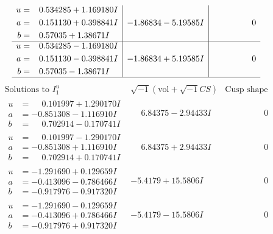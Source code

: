 \documentclass[1p]{elsarticle_modified}
\theoremstyle{definition}
\newcommand{\I}{\sqrt{-1}}
\begin{document}
$$\begin{array}{c|c|c}
\begin{aligned}
u &= \phantom{-}0.534285 + 1.169180 I \\
a &= \phantom{-}0.151130 + 0.398841 I \\
b &= \phantom{-}0.57035 + 1.38671 I\end{aligned}
 & -1.86834 - 5.19585 I & \phantom{-0.000000 } 0 \\ \hline\begin{aligned}
u &= \phantom{-}0.534285 - 1.169180 I \\
a &= \phantom{-}0.151130 - 0.398841 I \\
b &= \phantom{-}0.57035 - 1.38671 I\end{aligned}
 & -1.86834 + 5.19585 I & \phantom{-0.000000 } 0\\
 \hline 
 \end{array}$$\newpage$$\begin{array}{c|c|c}  
\text{Solutions to }I^u_{1}& \I (\text{vol} + \sqrt{-1}CS) & \text{Cusp shape}\\
 \hline 
\begin{aligned}
u &= \phantom{-}0.101997 + 1.290170 I \\
a &= -0.851308 - 1.116910 I \\
b &= \phantom{-}0.702914 - 0.170741 I\end{aligned}
 & \phantom{-}6.84375 - 2.94433 I & \phantom{-0.000000 } 0 \\ \hline\begin{aligned}
u &= \phantom{-}0.101997 - 1.290170 I \\
a &= -0.851308 + 1.116910 I \\
b &= \phantom{-}0.702914 + 0.170741 I\end{aligned}
 & \phantom{-}6.84375 + 2.94433 I & \phantom{-0.000000 } 0 \\ \hline\begin{aligned}
u &= -1.291690 + 0.129659 I \\
a &= -0.413096 - 0.786466 I \\
b &= -0.917976 - 0.917320 I\end{aligned}
 & -5.4179 + 15.5806 I & \phantom{-0.000000 } 0 \\ \hline\begin{aligned}
u &= -1.291690 - 0.129659 I \\
a &= -0.413096 + 0.786466 I \\
b &= -0.917976 + 0.917320 I\end{aligned}
 & -5.4179 - 15.5806 I & \phantom{-0.000000 } 0 \\ \hline\begin{aligned}

\end{aligned}
\end{array}$$
\end{document}

